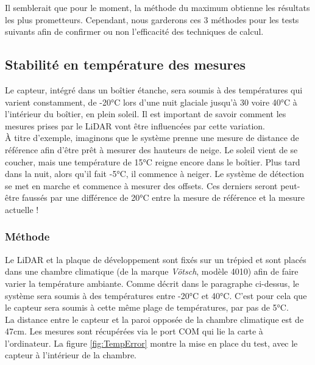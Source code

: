 Il semblerait que pour le moment, la méthode du maximum obtienne les résultats les plus prometteurs.
Cependant, nous garderons ces 3 méthodes pour les tests suivants afin de confirmer ou non l'efficacité
des techniques de calcul.

\subsection{Stabilité en température des mesures}

Le capteur, intégré dans un boîtier étanche, sera soumis à des températures qui varient constamment,
de -20°C lors d'une nuit glaciale jusqu'à 30 voire 40°C à l'intérieur du boîtier, en plein soleil.
Il est important de savoir comment les mesures prises par le LiDAR vont être influencées par cette 
variation.\\
À titre d'exemple, imaginons que le système prenne une mesure de distance de référence afin d'être
prêt à mesurer des hauteurs de neige. Le soleil vient de se coucher, mais une température de 15°C
reigne encore dans le boîtier. Plus tard dans la nuit, alors qu'il fait -5°C, il commence à neiger.
Le système de détection se met en marche et commence à mesurer des offsets. Ces derniers seront
peut-être faussés par une différence de 20°C entre la mesure de référence et la mesure actuelle !

\subsubsection{Méthode}

Le LiDAR et la plaque de développement sont fixés sur un trépied et sont placés dans une chambre
climatique (de la marque \emph{Vötsch}, modèle 4010) afin de faire varier la température ambiante.
Comme décrit dans le paragraphe ci-dessus, le système sera soumis à des températures entre -20°C et
40°C. C'est pour cela que le capteur sera soumis à cette même plage de températures, par pas de 5°C.\\
La distance entre le capteur et la paroi opposée de la chambre climatique est de 47cm. Les mesures 
sont récupérées via le port COM qui lie la carte à l'ordinateur. La figure \ref{fig:TempError} montre 
la mise en place du test, avec le capteur à l'intérieur de la chambre.

